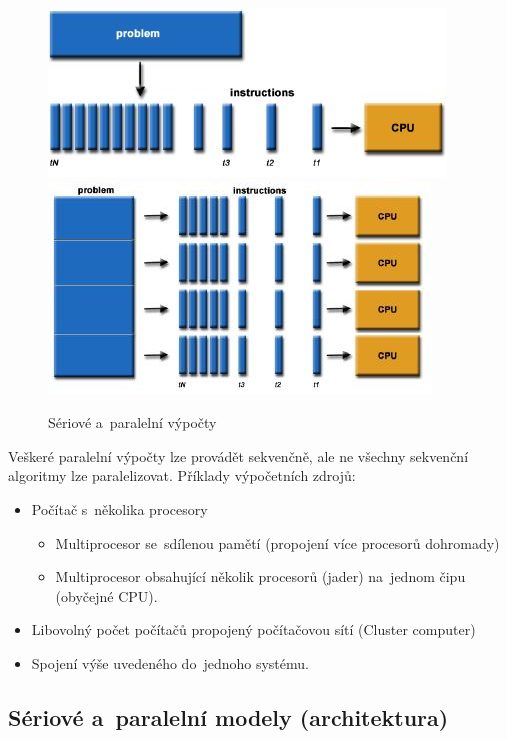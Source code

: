 \begin{figure}[ht]
	\centering
	\includegraphics[scale=0.7]{images/serialComputing.JPG}
	\hspace*{1em}
	\includegraphics[scale=0.7]{images/parallelComputing.JPG}

	\caption{Sériové a~paralelní výpočty}
\end{figure}

Veškeré paralelní výpočty lze provádět sekvenčně, ale ne všechny sekvenční algoritmy lze paralelizovat. Příklady výpočetních zdrojů:
\begin{itemize}
	\item Počítač s~několika procesory
	      \begin{itemize}
		      \item Multiprocesor se~sdílenou pamětí (propojení více procesorů dohromady)
		      \item Multiprocesor obsahující několik procesorů (jader) na~jednom čipu (obyčejné CPU).
	      \end{itemize}
	\item Libovolný počet počítačů propojený počítačovou sítí (Cluster computer)
	\item Spojení výše uvedeného do~jednoho systému.
\end{itemize}

\subsection{Sériové a~paralelní modely (architektura)}


